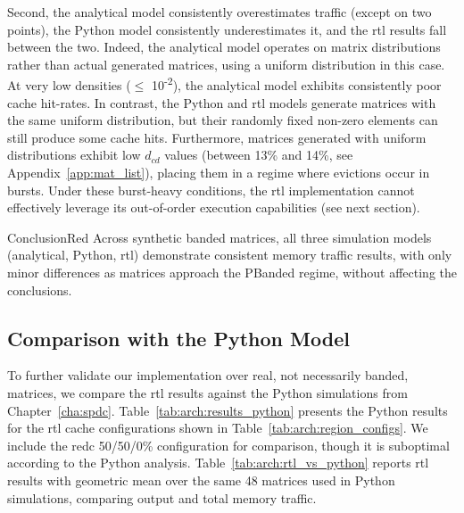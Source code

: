 Second, the analytical model consistently overestimates traffic (except on two points), the Python model consistently underestimates it, and the \acrshort{rtl} results fall between the two.
Indeed, the analytical model operates on matrix distributions rather than actual generated matrices, using a uniform distribution in this case.
At very low densities ($\leqslant$ 10\textsuperscript{-2}), the analytical model exhibits consistently poor cache \gls{hit}-rates.
In contrast, the Python and \acrshort{rtl} models generate matrices with the same uniform distribution, but their randomly fixed non-zero elements can still produce some cache \glspl{hit}.
Furthermore, matrices generated with uniform distributions exhibit low $d_\mathit{cd}$ values (between 13\% and 14\%, see Appendix~\ref{app:mat_list}), placing them in a regime where \glspl{eviction} occur in bursts.
Under these burst-heavy conditions, the \acrshort{rtl} implementation cannot effectively leverage its out-of-order execution capabilities (see next section).

\begin{highlight}{Conclusion}{Red}
    Across synthetic \gls{banded} matrices, all three simulation models (analytical, Python, \acrshort{rtl}) demonstrate consistent memory traffic results, with only minor differences as matrices approach the \gls{PBanded} regime, without affecting the conclusions.
\end{highlight}

\subsection{Comparison with the Python Model}

To further validate our implementation over real, not necessarily \gls{banded}, matrices, we compare the \acrshort{rtl} results against the Python simulations from Chapter~\ref{cha:spdc}.
Table~\ref{tab:arch:results_python} presents the Python results for the \acrshort{rtl} cache configurations shown in Table~\ref{tab:arch:region_configs}.
We include the \acrshort{redc} 50/50/0\% configuration for comparison, though it is suboptimal according to the Python analysis.
Table~\ref{tab:arch:rtl_vs_python} reports \acrshort{rtl} results with geometric mean over the same 48 matrices used in Python simulations, comparing output and total memory traffic.

